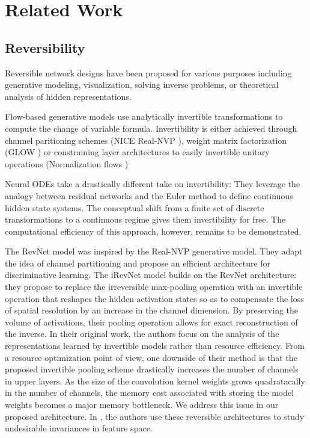 \documentclass[twocolumn]{bmcart}
\begin{document}
\section{Related Work}
\subsection{Reversibility}

Reversible network designs have been proposed for various purposes including generative modeling, visualization, solving inverse problems, or theoretical analysis of hidden representations.

Flow-based generative models use analytically invertible transformations to compute the change of variable formula. Invertibility is either achieved through channel paritioning schemes (NICE \cite{dinh2014nice} Real-NVP \cite{dinh2016density}), weight matrix factorization (GLOW \cite{kingma2018glow}) or constraining layer architectures to easily invertible unitary operations (Normalization flows \cite{rezende2015variational})

Neural ODEs \cite{chen2018neural} take a drastically different take on invertibility: They leverage the analogy between residual networks and the Euler method to define continuous hidden state systems.
The conceptual shift from a finite set of discrete transformations to a continuous regime gives them invertibility for free. 
The computational efficiency of this approach, however, remains to be demonstrated.

The RevNet model \cite{gomez2017reversible} was inspired by the Real-NVP generative model. They adapt the idea of channel partitioning and propose an efficient architecture for discriminative learning.
The iRevNet \cite{jacobsen2018revnet} model builds on the RevNet architecture: they propose to replace the irreversible max-pooling operation with an invertible operation that reshapes the hidden activation states
so as to compensate the loss of spatial resolution by an increase in the channel dimension. 
By preserving the volume of activations, their pooling operation allows for exact reconstruction of the inverse.
In their original work, the authors focus on the analysis of the representations learned by invertible models rather than resource efficiency.
From a resource optimization point of view, one downside of their method is that the proposed invertible pooling scheme drastically increases the number of channels in upper layers.
As the size of the convolution kernel weights grows quadratacally in the number of channels, the memory cost associated with storing the model weights becomes a major memory bottleneck.
We address this issue in our proposed architecture.
In \cite{jacobsen2018excessive}, the authors use these reversible architectures to study undesirable invariances in feature space.
\end{document}
